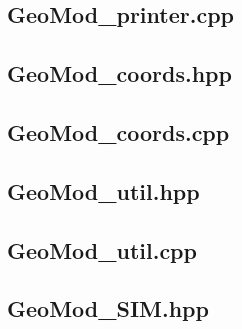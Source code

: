 \documentclass[a4paper, 12pt]{article}
\begin{document}
\subsection{GeoMod\_printer.cpp} \label{subsec:printer_cpp}


\subsection{GeoMod\_coords.hpp} \label{subsec:coords_hpp}

\subsection{GeoMod\_coords.cpp} \label{subsec:coords_cpp}


\subsection{GeoMod\_util.hpp} \label{subsec:util_hpp}

\subsection{GeoMod\_util.cpp} \label{subsec:util_cpp}


\subsection{GeoMod\_SIM.hpp} \label{subsec:SIM_hpp}

\end{document}
